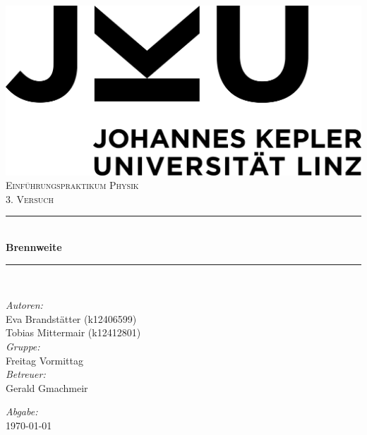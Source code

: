 \documentclass[a4paper,12pt]{article}
\begin{document}
\begin{titlepage}
    \centering
    \includegraphics[scale = 0.03]{bilder/JKU_Logo.png}\\[1.0 cm]	%
    \textsc{\Large Einführungspraktikum Physik}\\[0.5 cm]	        %
    \textsc{\large 3. Versuch}\\[0.5 cm]				            %
    \rule{\linewidth}{0.4 mm} \\[0.4 cm]
    { \huge \bfseries Brennweite}\\                                 %
    \rule{\linewidth}{0.4 mm} \\[1.5 cm]
    \begin{minipage}{0.8\textwidth}
        \begin{flushleft} \large
            \emph{Autoren:}\\
            Eva Brandstätter (k12406599)\\
            Tobias Mittermair (k12412801)\\
            \vspace{1cm}
            \emph{Gruppe:}\\
            Freitag Vormittag\\
            \vspace{1cm}
            \emph{Betreuer:}\\
            Gerald Gmachmeir
        \end{flushleft}
        \begin{flushright} \large
            \vspace{8cm}
            \emph{Abgabe:} \\
            \today
        \end{flushright}
    \end{minipage}~    
\end{titlepage}
\end{document}
